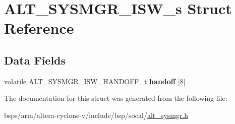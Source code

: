 \hypertarget{structALT__SYSMGR__ISW__s}{}\section{A\+L\+T\+\_\+\+S\+Y\+S\+M\+G\+R\+\_\+\+I\+S\+W\+\_\+s Struct Reference}
\label{structALT__SYSMGR__ISW__s}
\subsection*{Data Fields}
\begin{DoxyCompactItemize}
\item 
\mbox{\label{structALT__SYSMGR__ISW__s_a6fde11d83cd41d3e7a4e9855ef63cd09}} 
volatile A\+L\+T\+\_\+\+S\+Y\+S\+M\+G\+R\+\_\+\+I\+S\+W\+\_\+\+H\+A\+N\+D\+O\+F\+F\+\_\+t {\bfseries handoff} \mbox{[}8\mbox{]}
\end{DoxyCompactItemize}


The documentation for this struct was generated from the following file\+:\begin{DoxyCompactItemize}
\item 
bsps/arm/altera-\/cyclone-\/v/include/bsp/socal/\mbox{\hyperlink{alt__sysmgr_8h}{alt\+\_\+sysmgr.\+h}}\end{DoxyCompactItemize}
